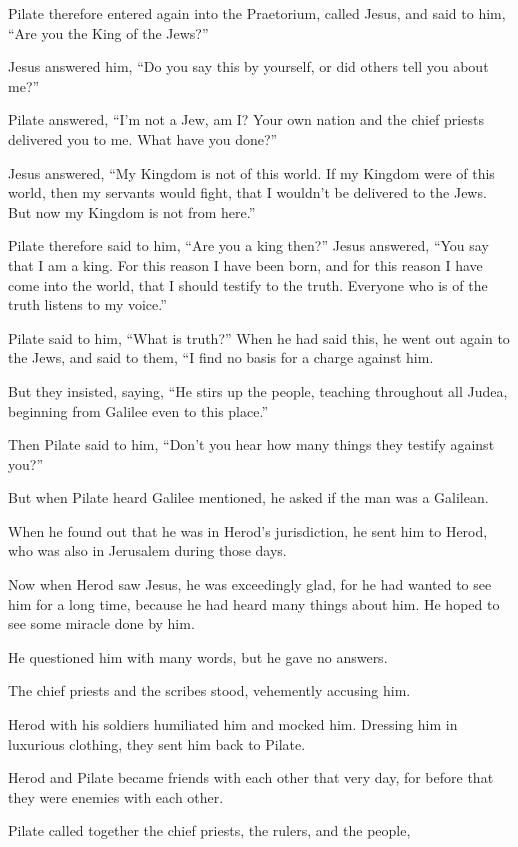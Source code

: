 Pilate therefore entered again into the Praetorium, called Jesus, and said to him, “Are you the King of the Jews?”

Jesus answered him, “Do you say this by yourself, or did others tell you about me?”

Pilate answered, “I’m not a Jew, am I? Your own nation and the chief priests delivered you to me. What have you done?”

Jesus answered, “My Kingdom is not of this world. If my Kingdom were of this world, then my servants would fight, that I wouldn’t be delivered to the Jews. But now my Kingdom is not from here.”

Pilate therefore said to him, “Are you a king then?” Jesus answered, “You say that I am a king. For this reason I have been born, and for this reason I have come into the world, that I should testify to the truth. Everyone who is of the truth listens to my voice.”

Pilate said to him, “What is truth?” When he had said this, he went out again to the Jews, and said to them, “I find no basis for a charge against him.

But they insisted, saying, “He stirs up the people, teaching throughout all Judea, beginning from Galilee even to this place.”

Then Pilate said to him, “Don’t you hear how many things they testify against you?”

But when Pilate heard Galilee mentioned, he asked if the man was a Galilean.

When he found out that he was in Herod’s jurisdiction, he sent him to Herod, who was also in Jerusalem during those days.

Now when Herod saw Jesus, he was exceedingly glad, for he had wanted to see him for a long time, because he had heard many things about him. He hoped to see some miracle done by him.

He questioned him with many words, but he gave no answers.

The chief priests and the scribes stood, vehemently accusing him.

Herod with his soldiers humiliated him and mocked him. Dressing him in luxurious clothing, they sent him back to Pilate.

Herod and Pilate became friends with each other that very day, for before that they were enemies with each other.

Pilate called together the chief priests, the rulers, and the people,

